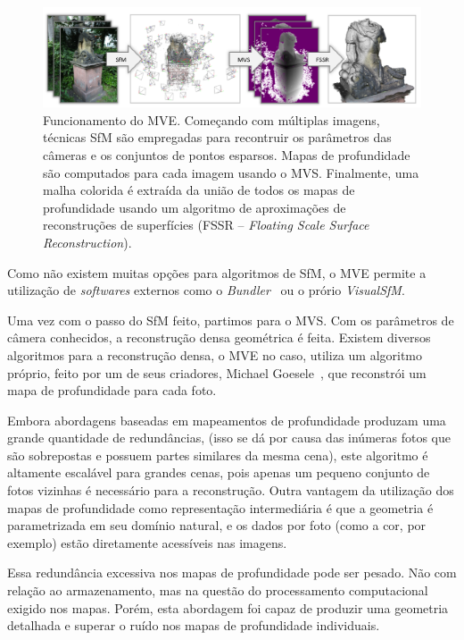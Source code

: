\begin{figure}[!h]
	\centering
	\includegraphics[width=0.8\linewidth]{figs/mvepipe.png}
	\caption{%
	Funcionamento do MVE. Começando com múltiplas imagens, técnicas SfM são empregadas para recontruir os parâmetros das câmeras e os conjuntos de pontos esparsos. Mapas de profundidade são computados para cada imagem usando o MVS. Finalmente, uma malha colorida é extraída da união de todos os mapas de profundidade usando um algoritmo de aproximações de reconstruções de superfícies (FSSR -- \emph{Floating Scale Surface Reconstruction}).
	\protect\cite{mve}
	}\label{fig:mvepipeline}
\end{figure}

Como não existem muitas opções para algoritmos de SfM, o MVE permite a utilização de \emph{softwares} externos como o \emph{Bundler}~\cite{snavely2010bundler} ou o prório \emph{VisualSfM}.

Uma vez com o passo do SfM feito, partimos para o MVS. Com os parâmetros de câmera conhecidos, a reconstrução densa geométrica é feita. Existem diversos algoritmos para a reconstrução densa, o MVE no caso, utiliza um algoritmo próprio, feito por um de seus criadores, Michael Goesele~\cite{goesele2007multi}, que reconstrói um mapa de profundidade para cada foto. 

Embora abordagens baseadas em mapeamentos de profundidade produzam uma grande quantidade de redundâncias, (isso se dá por causa das inúmeras fotos que são sobrepostas e possuem partes similares da mesma cena), este algoritmo é altamente escalável para grandes cenas, pois apenas um pequeno conjunto de fotos vizinhas é necessário para a reconstrução. Outra vantagem da utilização dos mapas de profundidade como representação intermediária é que a geometria é parametrizada em seu domínio natural, e os dados por foto (como a cor, por exemplo) estão diretamente acessíveis nas imagens.

Essa redundância excessiva nos mapas de profundidade pode ser pesado. Não com relação ao armazenamento, mas na questão do processamento computacional exigido nos mapas. Porém, esta abordagem foi capaz de produzir uma geometria detalhada e superar o ruído nos mapas de profundidade individuais.

